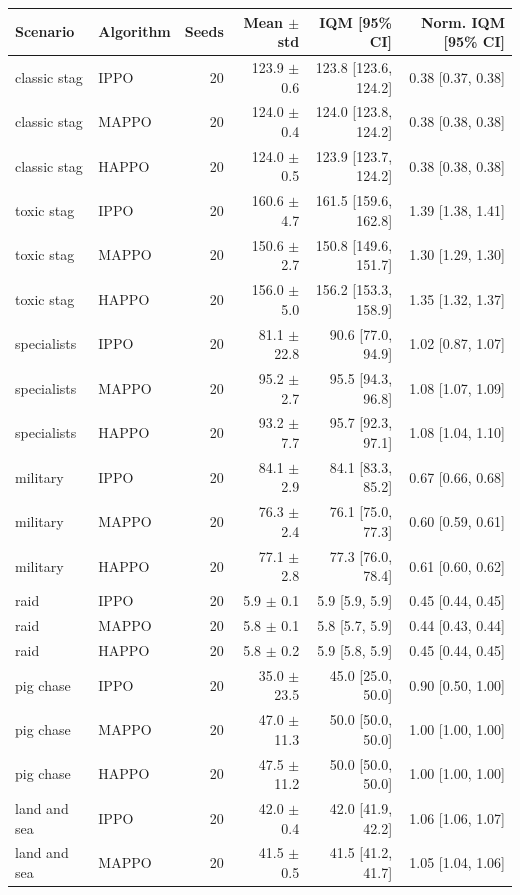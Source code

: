 \begin{tabular}{llrrrr}
\toprule
Scenario & Algorithm & Seeds & Mean $\pm$ std & IQM [95\% CI] & Norm. IQM [95\% CI] \\
\midrule
classic stag & IPPO & 20 & 123.9 $\pm$ 0.6 & 123.8 [123.6, 124.2] & 0.38 [0.37, 0.38] \\
classic stag & MAPPO & 20 & 124.0 $\pm$ 0.4 & 124.0 [123.8, 124.2] & 0.38 [0.38, 0.38] \\
classic stag & HAPPO & 20 & 124.0 $\pm$ 0.5 & 123.9 [123.7, 124.2] & 0.38 [0.38, 0.38] \\
toxic stag & IPPO & 20 & 160.6 $\pm$ 4.7 & 161.5 [159.6, 162.8] & 1.39 [1.38, 1.41] \\
toxic stag & MAPPO & 20 & 150.6 $\pm$ 2.7 & 150.8 [149.6, 151.7] & 1.30 [1.29, 1.30] \\
toxic stag & HAPPO & 20 & 156.0 $\pm$ 5.0 & 156.2 [153.3, 158.9] & 1.35 [1.32, 1.37] \\
specialists & IPPO & 20 & 81.1 $\pm$ 22.8 & 90.6 [77.0, 94.9] & 1.02 [0.87, 1.07] \\
specialists & MAPPO & 20 & 95.2 $\pm$ 2.7 & 95.5 [94.3, 96.8] & 1.08 [1.07, 1.09] \\
specialists & HAPPO & 20 & 93.2 $\pm$ 7.7 & 95.7 [92.3, 97.1] & 1.08 [1.04, 1.10] \\
military & IPPO & 20 & 84.1 $\pm$ 2.9 & 84.1 [83.3, 85.2] & 0.67 [0.66, 0.68] \\
military & MAPPO & 20 & 76.3 $\pm$ 2.4 & 76.1 [75.0, 77.3] & 0.60 [0.59, 0.61] \\
military & HAPPO & 20 & 77.1 $\pm$ 2.8 & 77.3 [76.0, 78.4] & 0.61 [0.60, 0.62] \\
raid & IPPO & 20 & 5.9 $\pm$ 0.1 & 5.9 [5.9, 5.9] & 0.45 [0.44, 0.45] \\
raid & MAPPO & 20 & 5.8 $\pm$ 0.1 & 5.8 [5.7, 5.9] & 0.44 [0.43, 0.44] \\
raid & HAPPO & 20 & 5.8 $\pm$ 0.2 & 5.9 [5.8, 5.9] & 0.45 [0.44, 0.45] \\
pig chase & IPPO & 20 & 35.0 $\pm$ 23.5 & 45.0 [25.0, 50.0] & 0.90 [0.50, 1.00] \\
pig chase & MAPPO & 20 & 47.0 $\pm$ 11.3 & 50.0 [50.0, 50.0] & 1.00 [1.00, 1.00] \\
pig chase & HAPPO & 20 & 47.5 $\pm$ 11.2 & 50.0 [50.0, 50.0] & 1.00 [1.00, 1.00] \\
land and sea & IPPO & 20 & 42.0 $\pm$ 0.4 & 42.0 [41.9, 42.2] & 1.06 [1.06, 1.07] \\
land and sea & MAPPO & 20 & 41.5 $\pm$ 0.5 & 41.5 [41.2, 41.7] & 1.05 [1.04, 1.06] \\

\end{tabular}
